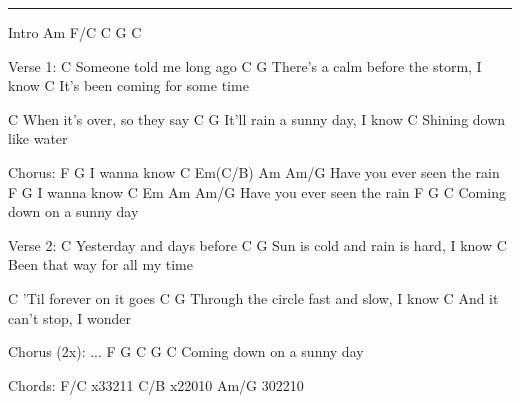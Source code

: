 \noindent\rule{\columnwidth}{1pt}

\begin{multicols}{2}
\begin{lstsong}
Intro
Am    F/C    C    G    C

Verse 1:
C
Someone told me long ago
C                                   G
There's a calm before the storm, I know
                   C
It's been coming for some time

C
When it's over, so they say
C                          G
It'll rain a sunny day, I know
                   C
Shining down like water

Chorus:
F         G
I wanna know
         C    Em(C/B)  Am    Am/G
Have you ever seen the rain
F         G
I wanna know
         C    Em       Am    Am/G
Have you ever seen the rain
F        G               C
Coming down on a sunny day
\end{lstsong}\vfill\columnbreak\begin{lstsong}
Verse 2:
C
Yesterday and days before
C                                G
Sun is cold and rain is hard, I know
                    C
Been that way for all my time

C
'Til forever on it goes
C                                    G
Through the circle fast and slow, I know
                       C
And it can't stop, I wonder

Chorus (2x):
...
F        G                C     G    C
Coming down on a sunny day


Chords:
F/C    x33211
C/B    x22010
Am/G   302210
\end{lstsong}
\end{multicols}
\newpage
